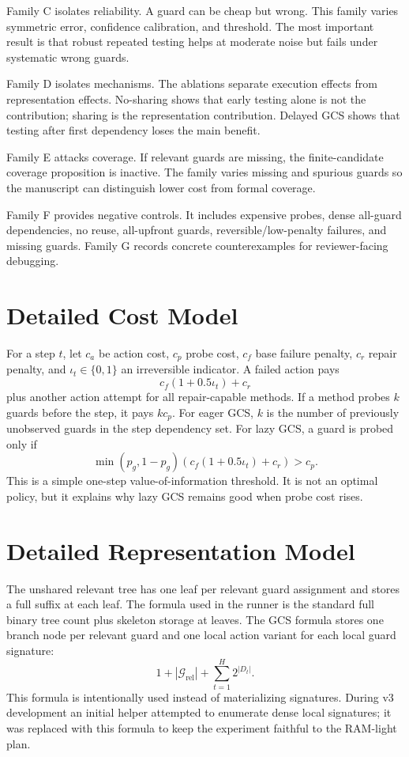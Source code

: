 \documentclass{article}
\newcommand{\guards}{\mathcal{G}}
\begin{document}
Family C isolates reliability. A guard can be cheap but wrong. This family varies symmetric error, confidence calibration, and threshold. The most important result is that robust repeated testing helps at moderate noise but fails under systematic wrong guards.

Family D isolates mechanisms. The ablations separate execution effects from representation effects. No-sharing shows that early testing alone is not the contribution; sharing is the representation contribution. Delayed GCS shows that testing after first dependency loses the main benefit.

Family E attacks coverage. If relevant guards are missing, the finite-candidate coverage proposition is inactive. The family varies missing and spurious guards so the manuscript can distinguish lower cost from formal coverage.

Family F provides negative controls. It includes expensive probes, dense all-guard dependencies, no reuse, all-upfront guards, reversible/low-penalty failures, and missing guards. Family G records concrete counterexamples for reviewer-facing debugging.

\section{Detailed Cost Model}
For a step $t$, let $c_a$ be action cost, $c_p$ probe cost, $c_f$ base failure penalty, $c_r$ repair penalty, and $\iota_t\in\{0,1\}$ an irreversible indicator. A failed action pays
\begin{equation}
c_f(1+0.5\iota_t)+c_r
\end{equation}
plus another action attempt for all repair-capable methods. If a method probes $k$ guards before the step, it pays $kc_p$. For eager GCS, $k$ is the number of previously unobserved guards in the step dependency set. For lazy GCS, a guard is probed only if
\begin{equation}
\min(p_g,1-p_g)\left(c_f(1+0.5\iota_t)+c_r\right)>c_p.
\end{equation}
This is a simple one-step value-of-information threshold. It is not an optimal policy, but it explains why lazy GCS remains good when probe cost rises.

\section{Detailed Representation Model}
The unshared relevant tree has one leaf per relevant guard assignment and stores a full suffix at each leaf. The formula used in the runner is the standard full binary tree count plus skeleton storage at leaves. The GCS formula stores one branch node per relevant guard and one local action variant for each local guard signature:
\begin{equation}
1+|\guards_{\mathrm{rel}}|+\sum_{t=1}^H2^{|D_t|}.
\end{equation}
This formula is intentionally used instead of materializing signatures. During v3 development an initial helper attempted to enumerate dense local signatures; it was replaced with this formula to keep the experiment faithful to the RAM-light plan.
\end{document}
